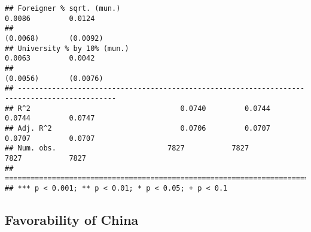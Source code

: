 \documentclass[
]{article}
\begin{document}
\begin{verbatim}
## Foreigner % sqrt. (mun.)                                            0.0086         0.0124    
##                                                                    (0.0068)       (0.0092)   
## University % by 10% (mun.)                                          0.0063         0.0042    
##                                                                    (0.0056)       (0.0076)   
## ---------------------------------------------------------------------------------------------
## R^2                                   0.0740         0.0744         0.0744         0.0747    
## Adj. R^2                              0.0706         0.0707         0.0707         0.0707    
## Num. obs.                          7827           7827           7827           7827         
## =============================================================================================
## *** p < 0.001; ** p < 0.01; * p < 0.05; + p < 0.1
\end{verbatim}

\hypertarget{favorability-of-china}{%
\subsection{Favorability of China}\label{favorability-of-china}}
\end{document}
